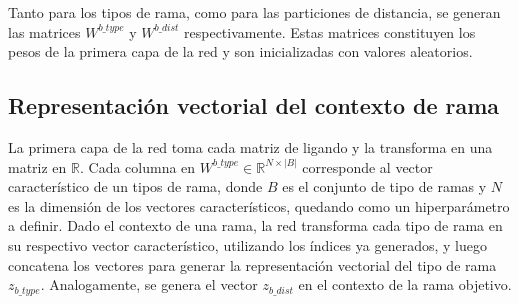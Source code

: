 Tanto para los tipos de rama, como para las particiones de distancia, se
generan las matrices $W^{b\_type}$ y $W^{b\_dist}$ respectivamente. Estas
matrices constituyen los pesos de la primera capa de la red y son
inicializadas con valores aleatorios.

\subsection{Representación vectorial del contexto de rama}

La primera capa de la red toma cada matriz de ligando y la transforma
en una matriz en $\mathbb{R}$. Cada columna en $W^{b\_type} \in
\mathbb{R}^{N\times |B|}$ corresponde al vector característico de un
tipos de rama, donde $B$ es el conjunto de tipo de ramas y $N$ es la
dimensión de los vectores característicos, quedando como un
hiperparámetro a definir.  Dado el contexto de una rama, la red
transforma cada tipo de rama en su respectivo vector característico,
utilizando los índices ya generados, y luego concatena los vectores
para generar la representación vectorial del tipo de rama
$z_{b\_type}$. Analogamente, se genera el vector $z_{b\_dist}$ en el
contexto de la rama objetivo.

